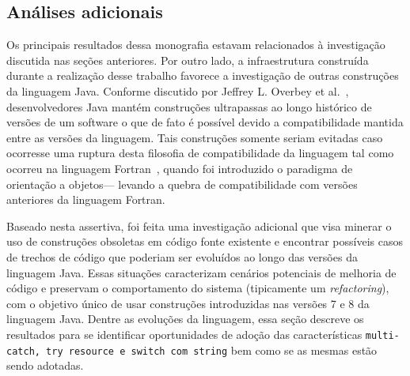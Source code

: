 \subsection{Análises adicionais}
Os principais resultados dessa monografia estavam relacionados à investigação discutida nas seções anteriores. Por outro lado, a infraestrutura construída  durante a realização desse trabalho favorece a investigação de outras construções da linguagem Java. Conforme discutido por Jeffrey L. Overbey et 
al.~\cite{Overbey:2009}, desenvolvedores Java mantém construções ultrapassas ao longo histórico de versões de um  software o que de fato é possível devido a compatibilidade mantida entre as versões da linguagem. Tais construções somente seriam evitadas caso ocorresse uma ruptura desta filosofia de compatibilidade da linguagem tal como ocorreu na linguagem Fortran~\cite{Overbey:2009}, 
quando foi  introduzido o paradigma de orientação a objetos--- levando a quebra de compatibilidade com versões anteriores da linguagem Fortran.

Baseado nesta assertiva, foi feita uma investigação adicional que visa minerar o uso de construções obsoletas 
em código fonte existente e encontrar possíveis casos de trechos de código que poderiam ser 
evoluídos ao longo das versões da linguagem Java. Essas situações caracterizam cenários potenciais de melhoria de código e preservam 
o comportamento do sistema (tipicamente um \textit{refactoring}), com o objetivo único de usar construções introduzidas nas versões 7 e 8 da linguagem Java.
Dentre as evoluções da linguagem, essa seção descreve os resultados 
para se identificar oportunidades de adoção das características 
\texttt{multi-catch, try resource e switch com string} 
bem como se as mesmas estão sendo adotadas.
%
%

